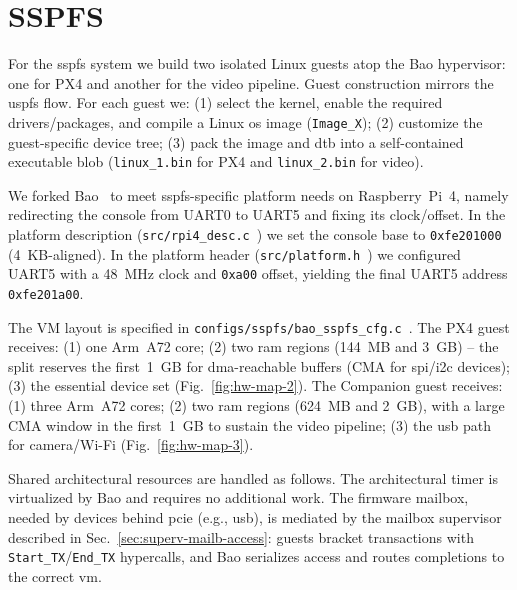 \section{SSPFS}
\label{sec:sspfs-implem}
For the \gls{sspfs} system we build two isolated Linux guests atop the Bao
hypervisor: one for PX4 and another for the video pipeline. Guest construction
mirrors the \gls{uspfs} flow. For each guest we:
(1) select the kernel, enable the required drivers/packages, and compile a Linux
\gls{os} image (\lstinline{Image_X});
(2) customize the guest-specific device tree;
(3) pack the image and \gls{dtb} into a self-contained executable blob
(\lstinline{linux_1.bin} for PX4 and \lstinline{linux_2.bin} for video).

We forked Bao~\cite{baoRepo-mine} to meet \gls{sspfs}-specific platform needs on
Raspberry~Pi~4, namely redirecting the console from UART0 to UART5 and fixing
its clock/offset. In the platform description
(\lstinline{src/rpi4_desc.c}~\cite{thesis-sw-github}) we set the console base to
\lstinline{0xfe201000} (4~KB-aligned). In the platform header
(\lstinline{src/platform.h}~\cite{thesis-sw-github}) we configured UART5 with a
48~MHz clock and \lstinline{0xa00} offset, yielding the final UART5 address
\lstinline{0xfe201a00}.

The VM layout is specified in
\lstinline{configs/sspfs/bao_sspfs_cfg.c}~\cite{thesis-sw-github}. The PX4
guest receives:
(1) one Arm~A72 core;
(2) two \gls{ram} regions (144~MB and 3~GB) -- the split reserves the first~1~GB
for \gls{dma}-reachable buffers (CMA for \gls{spi}/\gls{i2c} devices);
(3) the essential device set (Fig.~\ref{fig:hw-map-2}).
The Companion guest receives:
(1) three Arm~A72 cores;
(2) two \gls{ram} regions (624~MB and 2~GB), with a large CMA window in the
first~1~GB to sustain the video pipeline;
(3) the \gls{usb} path for camera/Wi-Fi (Fig.~\ref{fig:hw-map-3}).

Shared architectural resources are handled as follows. The architectural timer is
virtualized by Bao and requires no additional work. The firmware mailbox, needed
by devices behind \gls{pcie} (e.g., \gls{usb}), is mediated by the mailbox
supervisor described in Sec.~\ref{sec:superv-mailb-access}: guests bracket
transactions with \lstinline{Start_TX}/\lstinline{End_TX} hypercalls, and Bao
serializes access and routes completions to the correct \gls{vm}.

